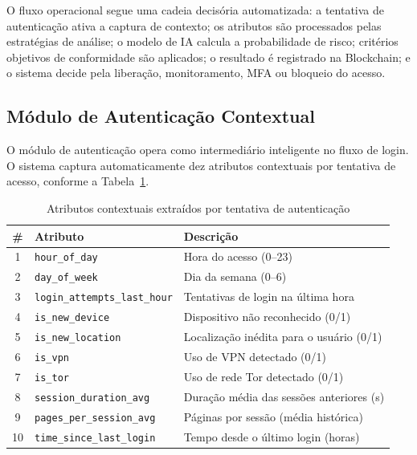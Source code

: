 \documentclass[12pt]{article}
\begin{document}

O fluxo operacional segue uma cadeia decisória automatizada: a tentativa de autenticação ativa a captura de contexto; os atributos são processados pelas estratégias de análise; o modelo de IA calcula a probabilidade de risco; critérios objetivos de conformidade são aplicados; o resultado é registrado na Blockchain; e o sistema decide pela liberação, monitoramento, MFA ou bloqueio do acesso.

\subsection{Módulo de Autenticação Contextual}

O módulo de autenticação opera como intermediário inteligente no fluxo de login. O sistema captura automaticamente dez atributos contextuais por tentativa de acesso, conforme a Tabela~\ref{tab:features}.

\begin{table}[H]
\centering
\caption{Atributos contextuais extraídos por tentativa de autenticação}
\label{tab:features}
\small
\begin{tabular}{@{}clp{7cm}@{}}
\toprule
\textbf{\#} & \textbf{Atributo} & \textbf{Descrição} \\
\midrule
1  & \texttt{hour\_of\_day}              & Hora do acesso (0--23) \\
2  & \texttt{day\_of\_week}              & Dia da semana (0--6) \\
3  & \texttt{login\_attempts\_last\_hour} & Tentativas de login na última hora \\
4  & \texttt{is\_new\_device}            & Dispositivo não reconhecido (0/1) \\
5  & \texttt{is\_new\_location}          & Localização inédita para o usuário (0/1) \\
6  & \texttt{is\_vpn}                    & Uso de VPN detectado (0/1) \\
7  & \texttt{is\_tor}                    & Uso de rede Tor detectado (0/1) \\
8  & \texttt{session\_duration\_avg}     & Duração média das sessões anteriores (s) \\
9  & \texttt{pages\_per\_session\_avg}   & Páginas por sessão (média histórica) \\
10 & \texttt{time\_since\_last\_login}   & Tempo desde o último login (horas) \\
\bottomrule
\end{tabular}
\end{table}
\end{document}
